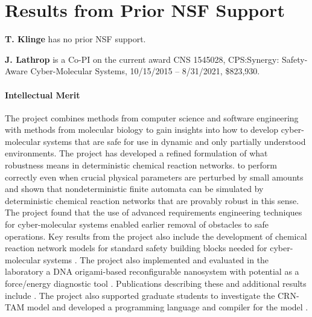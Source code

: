 
\section{Results from Prior NSF Support}
\label{sec:prior_nsf_support}

{\bf T. Klinge} has no prior NSF support.
\vspace{1em}

\noindent
{\bf J. Lathrop} is a Co-PI on the current award CNS 1545028, CPS:Synergy: Safety-Aware Cyber-Molecular Systems, 10/15/2015 -- 8/31/2021, \$823,930.

\paragraph{Intellectual Merit}
The project combines methods from computer science and software engineering with methods from molecular biology to gain insights into how to develop cyber-molecular systems that are safe for use in dynamic and only partially understood environments.
The project has developed a refined formulation of what robustness means in deterministic chemical reaction networks. to  perform correctly even when crucial physical parameters are perturbed by small amounts and shown that nondeterministic finite automata can be simulated by deterministic chemical reaction networks that are provably robust in this sense.  
The project found that the use of advanced requirements engineering techniques for cyber-molecular systems enabled earlier removal of obstacles to safe operations.  Key results from the project also include the development of chemical reaction network models for standard safety building blocks needed for cyber-molecular systems \cite{jKlLaLu20,  cElLaLu17, cElKlLa17, jEKLLLM17}.
The project also implemented and evaluated in the laboratory a DNA origami-based reconfigurable nanosystem with potential as a force/energy diagnostic tool \cite{jMatHen16, oMath16}.    Publications describing these and additional results include \cite{cKlin16,  cHuaStu16, jCaLuSt18, cElKlLa17,  jHKLLL18}.
The project also supported graduate students to investigate the CRN-TAM model and developed a programming language and compiler for the model \cite{ALCH}.

